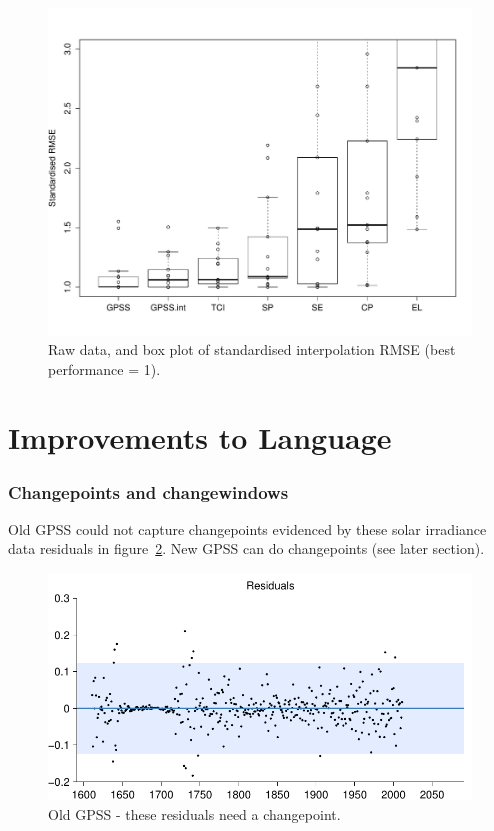 \documentclass{article}
\begin{document}
\begin{figure}[h]
\centering
\includegraphics[width=\columnwidth]{figures/box_interp_dist}
\caption{
Raw data, and box plot of standardised interpolation RMSE (best performance = 1).
}
\label{fig:box_interp_dist}
\end{figure}






\section{Improvements to Language}

\subsubsection{Changepoints and changewindows}

Old GPSS could not capture changepoints evidenced by these solar irradiance data residuals in figure~\ref{fig:not_cp}.
New GPSS can do changepoints (see later section).

\begin{figure}[h]
\centering
\includegraphics[width=0.98\columnwidth]{figures/old-gpss/02-solar-s_resid}
\caption{Old GPSS - these residuals need a changepoint.}
\label{fig:not_cp}
\end{figure}
\end{document}
